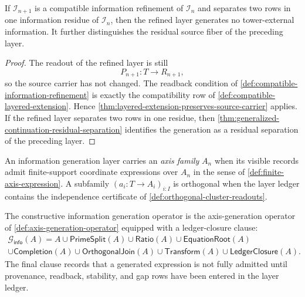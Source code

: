 \begin{theorem}
\label{thm:information-generation-fiber-refinement}
If $\mathcal I_{n+1}$ is a compatible information refinement of
$\mathcal I_n$ and separates two rows in one information residue of
$\mathcal I_n$, then the refined layer generates no tower-external
information. It further distinguishes the residual source fiber of the
preceding layer.
\end{theorem}

\begin{proof}
The readout of the refined layer is still
$$
P_{n+1}:T\to R_{n+1},
$$
so the source carrier has not changed. The readback condition of
\autoref{def:compatible-information-refinement} is exactly the
compatibility row of
\autoref{def:compatible-layered-extension}. Hence
\autoref{thm:layered-extension-preserves-source-carrier} applies. If the
refined layer separates two rows in one residue, then
\autoref{thm:generalized-continuation-residual-separation} identifies
the generation as a residual separation of the preceding layer.
\end{proof}

\begin{definition}
\label{def:information-generation-axes}
An information generation layer carries an \emph{axis family} $A_n$ when
its visible records admit finite-support coordinate expressions over
$A_n$ in the sense of \autoref{def:finite-axis-expression}. A subfamily
$(a_i:T\to A_i)_{i:I}$ is orthogonal when the layer ledger contains the
independence certificate of
\autoref{def:orthogonal-cluster-readouts}.
\end{definition}

\begin{definition}
\label{def:constructive-information-generation-operator}
The constructive information generation operator is the axis-generation
operator of \autoref{def:axis-generation-operator} equipped with a
ledger-closure clause:
$$
\begin{gathered}
\mathcal G_{\mathsf{info}}(A)
=
A
\cup
\mathsf{PrimeSplit}(A)
\cup
\mathsf{Ratio}(A)
\cup
\mathsf{EquationRoot}(A)\\
\cup
\mathsf{Completion}(A)
\cup
\mathsf{OrthogonalJoin}(A)
\cup
\mathsf{Transform}(A)
\cup
\mathsf{LedgerClosure}(A).
\end{gathered}
$$
The final clause records that a generated expression is not fully
admitted until provenance, readback, stability, and gap rows have been
entered in the layer ledger.
\end{definition}


